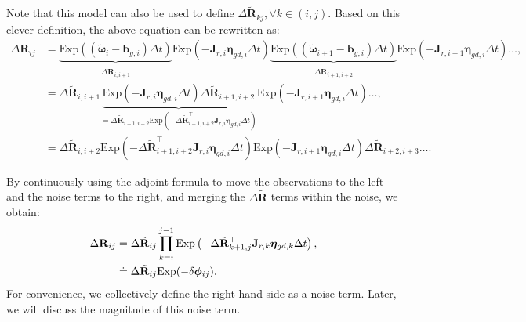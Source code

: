 Note that this model can also be used to define $\Delta \tilde{\mathbf{R}}_{kj}, \forall k \in (i,j)$. Based on this clever definition, the above equation can be rewritten as:
\begin{equation}\label{eq:approx-delta-R}
	\begin{aligned}
		\Delta \mathbf{R}_{ij} &= \underbrace{\mathrm{Exp}\left((\tilde{\boldsymbol{\omega}}_i - 
			\mathbf{b}_{g,i}) \Delta t \right)}_{\Delta\tilde{\mathbf{R}}_{i, i+1}} \mathrm{Exp} \left(-\mathbf{J}_{r,i} 
		\boldsymbol{\eta}_{gd, i} \Delta t \right) 
		\underbrace{\mathrm{Exp}\left((\tilde{\boldsymbol{\omega}}_{i+1} - \mathbf{b}_{g,i}) \Delta t 
			\right)}_{\Delta \tilde{\mathbf{R}}_{i+1, i+2}}\mathrm{Exp} \left(-\mathbf{J}_{r,i+1} 
		\boldsymbol{\eta}_{gd, i} \Delta t \right) \ldots, \\
		&= \Delta \tilde{\mathbf{R}}_{i, i+1} \underbrace{\mathrm{Exp} \left(-\mathbf{J}_{r,i} 
			\boldsymbol{\eta}_{gd, i} \Delta t \right)\Delta\tilde{\mathbf{R}}_{i+1, i+2}}_{=\Delta 
			\tilde{\mathbf{R}}_{i+1, i+2} \mathrm{Exp}(-\Delta \tilde{\mathbf{R}}_{i+1, i+2}^\top \mathbf{J}_{r,i} 
			\boldsymbol{\eta}_{gd, i} \Delta t)} \mathrm{Exp} \left(-\mathbf{J}_{r,i+1} \boldsymbol{\eta}_{gd, i} 
		\Delta t \right) \ldots, \\
		&=\Delta \tilde{\mathbf{R}}_{i, i+2} \mathrm{Exp}(-\Delta \tilde{\mathbf{R}}_{i+1, i+2}^\top 
		\mathbf{J}_{r,i} \boldsymbol{\eta}_{gd, i} \Delta t) \mathrm{Exp} \left(-\mathbf{J}_{r,i+1} 
		\boldsymbol{\eta}_{gd, i} \Delta t \right) \Delta \tilde{\mathbf{R}}_{i+2, i+3} \ldots .
	\end{aligned}
\end{equation}

By continuously using the adjoint formula to move the observations to the left and the noise terms to the right, and merging the $\Delta \tilde{\mathbf{R}}$ terms within the noise, we obtain:
\begin{equation}\label{eq:def-of-delta-R}
	\begin{aligned}
		\Delta \mathbf{R}_{ij} &= \Delta \tilde{\mathbf{R}}_{ij} \prod_{k=i}^{j-1} \mathrm{Exp}\left( -\Delta 
		\tilde{\mathbf{R}}_{k+1, j}^\top \mathbf{J}_{r,k} \boldsymbol{\eta}_{gd, k} \Delta t \right), \\
		& \buildrel\textstyle.\over= \Delta \tilde{\mathbf{R}}_{ij} \mathrm{Exp} (-\delta \boldsymbol{\phi}_{ij}).
	\end{aligned}
\end{equation}
For convenience, we collectively define the right-hand side as a noise term. Later, we will discuss the magnitude of this noise term.

